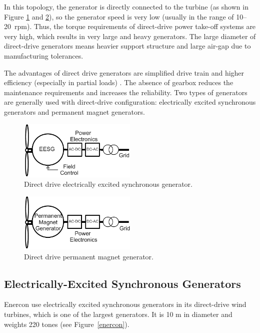\documentclass[a4paper, 11pt]{article} %
\begin{document}
In this topology, the generator is directly connected to the turbine (as shown in Figure \ref{eesg} and \ref{ddpmg}), so the generator speed is very low (usually in the range of 10--20~rpm). Thus, the torque requirements of direct-drive power take-off systems are very high, which results in very large and heavy generators. The large diameter of direct-drive generators means heavier support structure and large air-gap due to manufacturing tolerances.

The advantages of direct drive generators are simplified drive train and higher efficiency (especially in partial loads) \cite{Li2008a}. The absence of gearbox reduces the maintenance requirements and increases the reliability. Two types of generators are generally used with direct-drive configuration: electrically excited synchronous generators and permanent magnet generators. 

\begin{figure}
    \centering
    \includegraphics[width=0.5\textwidth]{EESG}
    \caption{Direct drive electrically excited synchronous generator.} 
    \label{eesg}
  \end{figure}

  \begin{figure}
    \centering
    \includegraphics[width=0.5\textwidth]{DDPMG}
    \caption{Direct drive permanent magnet generator.} 
    \label{ddpmg}
  \end{figure}


\subsection{Electrically-Excited Synchronous Generators}

Enercon use electrically excited synchronous 
generators in its direct-drive wind turbines, which is one of the largest generators. It is 10 m in diameter and weights 220 tones (see Figure~\ref{enercon}). 
\end{document}
